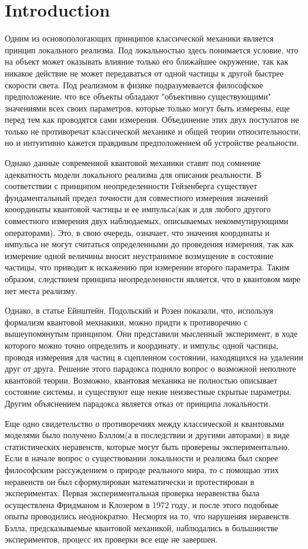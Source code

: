 \documentclass[11pt]{article}
\begin{document}
\section{Introduction}
Одним из основопологающих принципов классической механики является принцип локального реализма. Под локальностью здесь понимается условие, что на объект может оказывать влияние только его ближайшее окружение, так как никакое действие не может передаваться от одной частицы к другой быстрее скорости света. Под реализмом в физике подразумевается философское предположение, что все объекты обладают "объективно существующими" значениями всех своих параметров, которые только могут быть измерены, еще перед тем как проводятся сами измерения. Объединение этих двух постулатов не только не противоречат классической механике и общей теории относительности, но и интуитивно кажется правдивым предположением об устройстве реальности.

Однако данные современной квантовой механики ставят под сомнение адекватность модели локального реализма для описания реальности. В соответствии с принципом неопределенности Гейзенберга существует фундаментальный предел точности для совместного измерения значений кооординаты квантовой частицы и ее импульса(как и для любого другого совместного измерения двух наблюдаемых, описываемых некоммутирующими операторами). Это, в свою очередь, означает, что значения координаты и импульса не могут считаться определенными до проведения измерения, так как измерение одной величины вносит неустранимое возмущение в состояние частицы, что приводит к искажению при измерении второго параметра. Таким образом, следствием принципа неопределенности является, что в квантовом мире нет места реализму.

Однако, в статье \cite{EPR} Ейнштейн, Подольский и Розен показали, что, используя формализм квантовой мехнакики, можно придти к противоречию с вышеупомянутым принципом. Они представили мысленный эксперимент, в ходе которого можно точно определить и координату, и импульс одной частицы, проводя измерения для частиц в сцепленном состоянии, находящихся на удалении друг от друга. Решение этого парадокса подняло вопрос о возможной неполноте квантовой теории. Возможно, квантовая механика не полностью описывает состояние системы, и существуют еще некие неизвестные скрытые параметры. Другим объяснением парадокса является отказ от принципа локальности.

Еще одно свидетельство о противоречиях между классической и квантовыми моделями было получено Бэллом(а в последствии и другими авторами) в виде статистических неравенств, которые могут быть проверены экспериментально. Если в начале вопрос о существовании локальности и реализма был скорее философским рассуждением о природе реального мира, то с помощью этих неравенств он был сформулирован математически и протестирован в экспериментах. Первая экспериментальная проверка неравенства была осуществлена Фридманом и Клозером в 1972 году, и после этого подобные опыты проводились неоднократно. Несмортя на то, что нарушения неравенств Бэлла, предсказываемые квантовой механикой, наблюдались в большинстве экспериментов, процесс их проверки все еще не завершен.
\end{document}
